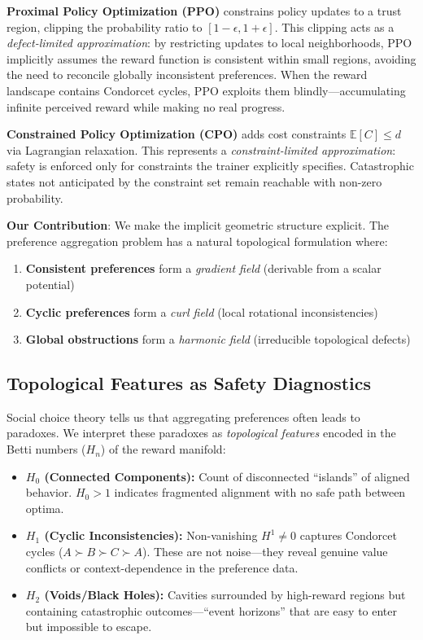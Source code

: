 \documentclass{article}
\begin{document}
\textbf{Proximal Policy Optimization (PPO)} \citep{schulman2017proximal} constrains policy updates to a trust region, clipping the probability ratio to $[1-\epsilon, 1+\epsilon]$. This clipping acts as a \emph{defect-limited approximation}: by restricting updates to local neighborhoods, PPO implicitly assumes the reward function is consistent within small regions, avoiding the need to reconcile globally inconsistent preferences. When the reward landscape contains Condorcet cycles, PPO exploits them blindly---accumulating infinite perceived reward while making no real progress.

\textbf{Constrained Policy Optimization (CPO)} \citep{achiam2017constrained} adds cost constraints $\mathbb{E}[C] \le d$ via Lagrangian relaxation. This represents a \emph{constraint-limited approximation}: safety is enforced only for constraints the trainer explicitly specifies. Catastrophic states not anticipated by the constraint set remain reachable with non-zero probability.

\textbf{Our Contribution}: We make the implicit geometric structure explicit. The preference aggregation problem has a natural topological formulation where:
\begin{enumerate}[leftmargin=*]
    \item \textbf{Consistent preferences} form a \emph{gradient field} (derivable from a scalar potential)
    \item \textbf{Cyclic preferences} form a \emph{curl field} (local rotational inconsistencies)
    \item \textbf{Global obstructions} form a \emph{harmonic field} (irreducible topological defects)
\end{enumerate}

\subsection{Topological Features as Safety Diagnostics}

Social choice theory \citep{condorcet1785} tells us that aggregating preferences often leads to paradoxes. We interpret these paradoxes as \emph{topological features} encoded in the Betti numbers ($H_n$) of the reward manifold:

\begin{itemize}[leftmargin=*]
    \item \textbf{$H_0$ (Connected Components):} Count of disconnected ``islands'' of aligned behavior. $H_0 > 1$ indicates fragmented alignment with no safe path between optima.
    
    \item \textbf{$H_1$ (Cyclic Inconsistencies):} Non-vanishing $H^1 \neq 0$ captures Condorcet cycles ($A \succ B \succ C \succ A$). These are not noise---they reveal genuine value conflicts or context-dependence in the preference data.
    
    \item \textbf{$H_2$ (Voids/Black Holes):} Cavities surrounded by high-reward regions but containing catastrophic outcomes---``event horizons'' that are easy to enter but impossible to escape.
\end{itemize}
\end{document}
